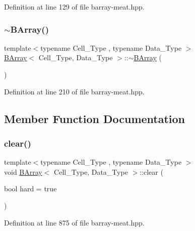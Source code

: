 Definition at line 129 of file barray-\/meat.\+hpp.

\mbox{\label{class_b_array_af39acdf29aa5999a7f5fd48141be384e}} 
\subsubsection{\texorpdfstring{$\sim$\+B\+Array()}{~BArray()}}
{\footnotesize\ttfamily template$<$typename Cell\+\_\+\+Type , typename Data\+\_\+\+Type $>$ \\
\hyperlink{class_b_array}{B\+Array}$<$ Cell\+\_\+\+Type, Data\+\_\+\+Type $>$\+::$\sim$\hyperlink{class_b_array}{B\+Array} (\begin{DoxyParamCaption}{ }\end{DoxyParamCaption})\hspace{0.3cm}{\ttfamily [inline]}}



Definition at line 210 of file barray-\/meat.\+hpp.



\subsection{Member Function Documentation}
\mbox{\label{class_b_array_a6dd5ebff333b376c6fb569e48290935f}} 
\subsubsection{\texorpdfstring{clear()}{clear()}}
{\footnotesize\ttfamily template$<$typename Cell\+\_\+\+Type , typename Data\+\_\+\+Type $>$ \\
void \hyperlink{class_b_array}{B\+Array}$<$ Cell\+\_\+\+Type, Data\+\_\+\+Type $>$\+::clear (\begin{DoxyParamCaption}\item[{bool}]{hard = {\ttfamily true} }\end{DoxyParamCaption})\hspace{0.3cm}{\ttfamily [inline]}}



Definition at line 875 of file barray-\/meat.\+hpp.

\mbox{\label{class_b_array_a4096e4447f91ba52766587a08c62f1fa}} 
